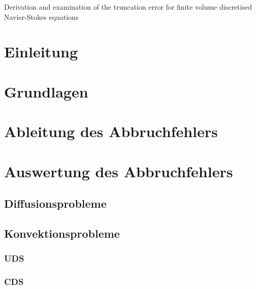\documentclass[bigchapter,twoside,report,11pt,type=bsc,colorback,accentcolor=tud2c]{tudthesis}
\begin{document}
%
{Derivation and examination of the truncation error for finite volume discretised Navier-Stokes equations}
\author{Paul Lange}
\dateofexam{\today}{\today}
\makethesistitle
{}

\tableofcontents
\listoffigures

\chapter{Einleitung}

\cleardoublepage

\chapter{Grundlagen}






\cleardoublepage




\chapter{Ableitung des Abbruchfehlers}
\label{chap:herleitung}





\chapter{Auswertung des Abbruchfehlers}
\section{Diffusionsprobleme}
\section{Konvektionsprobleme}
\subsection{UDS}
\subsection{CDS}
\end{document}
